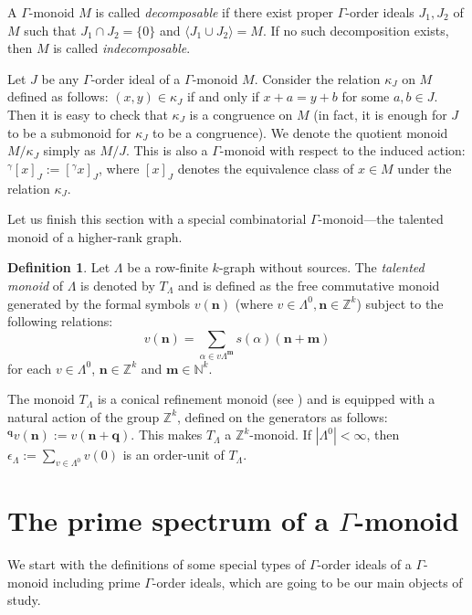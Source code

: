 \documentclass[a4paper,reqno,12pt]{amsart}
\numberwithin{equation}{section}
\theoremstyle{definition}
\newtheorem{dfn}[thm]{Definition}
\theoremstyle{remark}
\newcommand{\N}{\mathbf{n}}
\newcommand{\M}{\mathbf{m}}
\newcommand{\Q}{\mathbf{q}}
\begin{document}
A $\Gamma$-monoid $M$ is called \emph{decomposable} if there exist proper $\Gamma$-order ideals $J_1,J_2$ of $M$ such that $J_1\cap J_2=\{0\}$ and $\langle J_1\cup J_2\rangle=M$. If no such decomposition exists, then $M$ is called \emph{indecomposable}.    

Let $J$ be any $\Gamma$-order ideal of a $\Gamma$-monoid $M$. Consider the relation $\kappa_J$ on $M$ defined as follows: $(x,y)\in \kappa_J$ if and only if $x+a=y+b$ for some $a,b\in J$. Then it is easy to check that $\kappa_J$ is a congruence on $M$ (in fact, it is enough for $J$ to be a submonoid for $\kappa_J$ to be a congruence). We denote the quotient monoid $M/{\kappa_J}$ simply as $M/{J}$. This is also a $\Gamma$-monoid with respect to the induced action: $^\gamma[x]_J:=[^\gamma x]_J$, where $[x]_J$ denotes the equivalence class of $x\in M$ under the relation $\kappa_J$.

Let us finish this section with a special combinatorial $\Gamma$-monoid---the talented monoid of a higher-rank graph. 

\begin{dfn}\label{def talented monoid}
Let $\Lambda$ be a row-finite $k$-graph without sources. The \emph{talented monoid} of $\Lambda$ is denoted by $T_\Lambda$ and is defined as the free commutative monoid generated by the formal symbols $v(\N)$ (where $v\in \Lambda^0, \N\in \mathbb{Z}^k$) subject to the following relations:
\begin{equation}\label{TM equation}
    v(\N)=\displaystyle{\sum_{\alpha\in v\Lambda^{\M}}} s(\alpha)(\N+\M)
\end{equation}
for each $v\in \Lambda^0$, $\N\in \mathbb{Z}^k$ and $\M\in \mathbb{N}^k$.
\end{dfn}

The monoid $T_\Lambda$ is a conical refinement monoid (see \cite[Theorem 3.18]{HMPS1}) and is equipped with a natural action of the group $\mathbb{Z}^k$, defined on the generators as follows: $^\Q v(\N):=v(\N+\Q)$. This makes $T_\Lambda$ a $\mathbb{Z}^k$-monoid. If $|\Lambda^0|<\infty$, then $\epsilon_\Lambda:=\displaystyle{\sum_{v\in \Lambda^0}} v(0)$ is an order-unit of $T_\Lambda$. 

\section{The prime spectrum of a \texorpdfstring{$\Gamma$}{Gamma}-monoid}\label{sec prime spec of monoid}
We start with the definitions of some special types of $\Gamma$-order ideals of a $\Gamma$-monoid including prime $\Gamma$-order ideals, which are going to be our main objects of study. 
\end{document}
